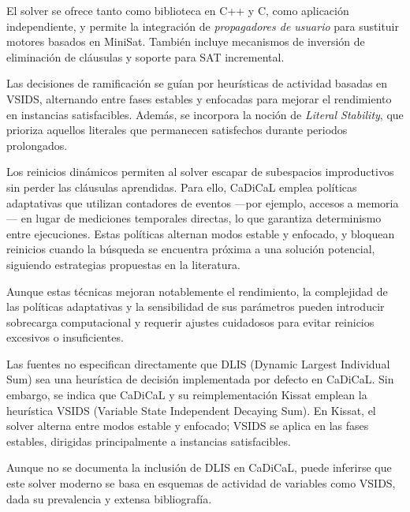 El solver se ofrece tanto como biblioteca en C++ y C, como aplicación independiente, y permite la integración de \textit{propagadores de usuario} para sustituir motores basados en MiniSat. También incluye mecanismos de inversión de eliminación de cláusulas y soporte para SAT incremental. %

Las decisiones de ramificación se guían por heurísticas de actividad basadas en VSIDS, alternando entre fases estables y enfocadas para mejorar el rendimiento en instancias satisfacibles. Además, se incorpora la noción de \textit{Literal Stability}, que prioriza aquellos literales que permanecen satisfechos durante periodos prolongados. %

Los reinicios dinámicos permiten al solver escapar de subespacios improductivos sin perder las cláusulas aprendidas. Para ello, CaDiCaL emplea políticas adaptativas que utilizan contadores de eventos —por ejemplo, accesos a memoria— en lugar de mediciones temporales directas, lo que garantiza determinismo entre ejecuciones. Estas políticas alternan modos estable y enfocado, y bloquean reinicios cuando la búsqueda se encuentra próxima a una solución potencial, siguiendo estrategias propuestas en la literatura. %

Aunque estas técnicas mejoran notablemente el rendimiento, la complejidad de las políticas adaptativas y la sensibilidad de sus parámetros pueden introducir sobrecarga computacional y requerir ajustes cuidadosos para evitar reinicios excesivos o insuficientes.
 
Las fuentes no especifican directamente que DLIS (Dynamic Largest Individual Sum) sea una heurística de decisión implementada por defecto en CaDiCaL. Sin embargo, se indica que CaDiCaL y su reimplementación Kissat emplean la heurística VSIDS (Variable State Independent Decaying Sum). En Kissat, el solver alterna entre modos estable y enfocado; VSIDS se aplica en las fases estables, dirigidas principalmente a instancias satisfacibles. %

Aunque no se documenta la inclusión de DLIS en CaDiCaL, puede inferirse que este solver moderno se basa en esquemas de actividad de variables como VSIDS, dada su prevalencia y extensa bibliografía. %

